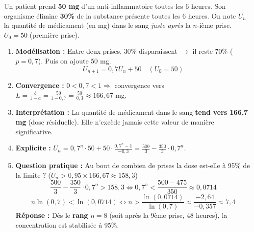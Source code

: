 \documentclass[11pt]{article}
\begin{document}
\begin{exemplebox}
Un patient prend \textbf{50 mg} d'un anti-inflammatoire toutes les 6 heures. Son organisme élimine \textbf{30\%} de la substance présente toutes les 6 heures.
On note $U_n$ la quantité de médicament (en mg) dans le sang \emph{juste après} la $n$-ième prise. $U_0 = 50$ (première prise).
\begin{enumerate}
    \item \textbf{Modélisation :} Entre deux prises, 30\% disparaissent $\rightarrow$ il reste 70\% ($p=0{,}7$). Puis on ajoute 50 mg.
    \[ U_{n+1} = 0{,}7 U_n + 50 \quad (U_0 = 50) \]
    \item \textbf{Convergence :} $0 < 0{,}7 < 1 \Rightarrow$ convergence vers $L = \frac{b}{1-a} = \frac{50}{1-0{,}7} = \frac{50}{0{,}3} \approx 166{,}67$ mg.
    \item \textbf{Interprétation :} La quantité de médicament dans le sang \textbf{tend vers 166,7 mg} (dose résiduelle). Elle n'excède jamais cette valeur de manière significative.
    \item \textbf{Explicite :} $U_n = 0{,}7^n \cdot 50 + 50 \cdot \frac{0{,}7^n - 1}{-0{,}3} = \frac{500}{3} - \frac{350}{3} \cdot 0{,}7^n$.
    \item \textbf{Question pratique :} Au bout de combien de prises la dose est-elle à 95\% de la limite ? ($U_n > 0{,}95 \times 166{,}67 \approx 158{,}3$)
    \[ \frac{500}{3} - \frac{350}{3} \cdot 0{,}7^n > 158{,}3 \iff 0{,}7^n < \frac{500 - 475}{350} \approx 0{,}0714 \]
    \[ n \ln(0{,}7) < \ln(0{,}0714) \iff n > \frac{\ln(0{,}0714)}{\ln(0{,}7)} \approx \frac{-2{,}64}{-0{,}357} \approx 7{,}4 \]
    \textbf{Réponse :} Dès le \textbf{rang $n=8$} (soit après la 9ème prise, 48 heures), la concentration est stabilisée à 95\%.
\end{enumerate}
\end{exemplebox}
\end{document}

